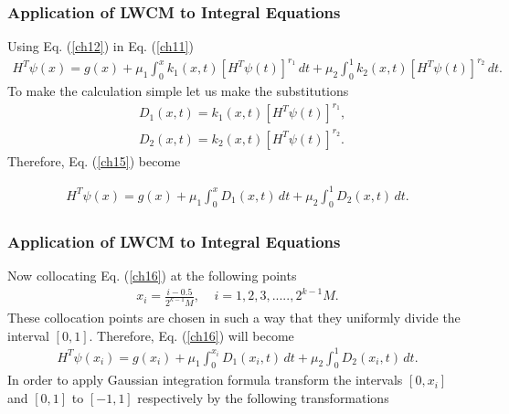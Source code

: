 \documentclass{beamer}
\begin{document}
\begin{frame}\frametitle{Application of LWCM to Integral Equations}
	\justifying
	Using Eq. (\ref{ch12}) in Eq. (\ref{ch11})
	\tiny
	\begin{eqnarray}\label{ch15}
	H^{T}\psi(x) = g(x) +\mu_{1}\int^x_0 k_{1}(x,t)[H^{T}\psi(t)]^{r_{1}}\,dt + \mu_{2}\int^1_0 k_{2}(x,t)[H^{T}\psi(t)]^{r_{2}}\,dt.
	\end{eqnarray}
	\normalsize
To make the calculation simple let us make the substitutions
\begin{align}
&D_{1}(x,t)= k_{1}(x,t)[H^{T}\psi(t)]^{r_{1}},\nonumber\\
&D_{2}(x,t)= k_{2}(x,t)[H^{T}\psi(t)]^{r_{2}}\nonumber.
\end{align}
\small
Therefore, Eq. (\ref{ch15}) become

\begin{eqnarray}\label{ch16}
H^{T}\psi(x) = g(x) +\mu_{1}\int^x_0 D_{1}(x,t)\,dt + \mu_{2}\int^1_0 D_{2}(x,t)\,dt.
\end{eqnarray}
\end{frame}
\begin{frame}\frametitle{Application of LWCM to Integral Equations}
	\justifying
	Now collocating Eq. (\ref{ch16}) at the following points
	\begin{eqnarray}
	x_{i}=\frac{i-0.5}{2^{k-1}M},\nonumber~~~~~i=1, 2, 3, .....,2^{k-1}M.
	\end{eqnarray}
	\small
These collocation points are chosen in such a way that they uniformly divide the interval $[0, 1]$. Therefore, Eq. (\ref{ch16}) will become
\begin{eqnarray}\label{ch16a}
H^{T}\psi(x_{i}) = g(x_{i}) +\mu_{1}\int^{x_{i}}_0 D_{1}(x_{i},t)\,dt + \mu_{2}\int^1_0 D_{2}(x_{i},t)\,dt.
\end{eqnarray}
\small
In order to apply Gaussian integration formula transform the intervals $[0, x_{i}]$ and $[0, 1]$ to $[-1, 1]$ respectively by the following transformations
\end{frame}
\end{document}
